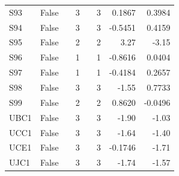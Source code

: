 {\begin{longtable}{lrrrrrrr}
  S93 & False &  & 3 &  & 3 & 0.1867 & 0.3984 \\
  S94 & False &  & 3 &  & 3 & -0.5451 & 0.4159 \\
  S95 & False &  & 2 &  & 2 & 3.27 & -3.15 \\
  S96 & False &  & 1 &  & 1 & -0.8616 & 0.0404 \\
  S97 & False &  & 1 &  & 1 & -0.4184 & 0.2657 \\
  S98 & False &  & 3 &  & 3 & -1.55 & 0.7733 \\
  S99 & False &  & 2 &  & 2 & 0.8620 & -0.0496 \\
  UBC1 & False &  & 3 &  & 3 & -1.90 & -1.03 \\
  UCC1 & False &  & 3 &  & 3 & -1.64 & -1.40 \\
  UCE1 & False &  & 3 &  & 3 & -0.1746 & -1.71 \\
  UJC1 & False &  & 3 &  & 3 & -1.74 & -1.57 \\
\end{longtable}
}
